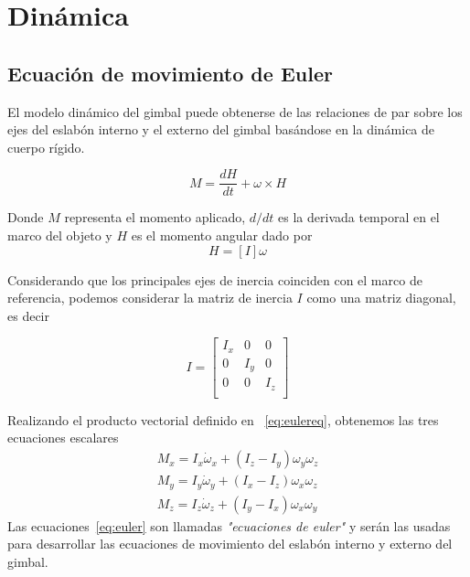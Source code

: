\section{Din\'{a}mica}

\subsection{Ecuaci\'{o}n de movimiento de Euler}
El modelo din\'{a}mico del gimbal puede obtenerse de las relaciones de par sobre los ejes del eslab\'{o}n interno y el externo del gimbal bas\'{a}ndose en la din\'{a}mica de cuerpo r\'{i}gido.

\begin{equation}
M=\frac{d H}{dt}+ \omega \times H
\label{eq:eulereq}
\end{equation}

Donde $M$ representa el momento aplicado, $d/dt$ es la derivada temporal en el marco del objeto y $H$ es el momento angular dado por
\begin{equation}
H=[I]\omega
\end{equation}

Considerando que los principales ejes de inercia coinciden con el marco de referencia, podemos considerar la matriz de inercia $I$ como una matriz diagonal, es decir

\begin{equation}
I = \left[ 
\begin{array}{ccc}
I_{x}  &      0   &   0 \\
   0     &  I_{y} &   0 \\
   0     &      0   & I_{z}\\
\end{array} \right]
\end{equation}

Realizando el producto vectorial definido en ~\ref{eq:eulereq}, obtenemos las tres ecuaciones escalares
\begin{equation}
\begin{array}{c}
M_{x}=I_{x}\dot{\omega}_{x}+\left(I_{z}-I_{y}\right)\omega _{y}\omega _{z}\\
M_{y}=I_{y}\dot{\omega}_{y}+\left(I_{x}-I_{z}\right)\omega _{x}\omega _{z}\\
M_{z}=I_{z}\dot{\omega}_{z}+\left(I_{y}-I_{x}\right)\omega _{x}\omega _{y}
\end{array}
\label{eq:euler}
\end{equation}
Las ecuaciones~\ref{eq:euler} son llamadas \textit{"ecuaciones de euler"} y ser\'{a}n las usadas para desarrollar las ecuaciones de movimiento del eslab\'{o}n interno y externo del gimbal.

